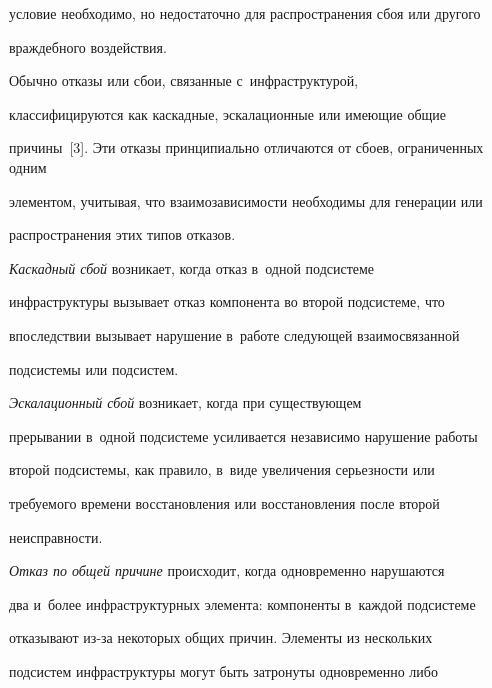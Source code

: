 условие необходимо, но недостаточно для распространения сбоя или другого  


враж\-деб\-но\-го воз\-дей\-ст\-вия.


{





}





  


  Обычно отказы или сбои, связанные с~инфраструктурой, 


классифицируются как кас\-кад\-ные, эскалационные или име\-ющие общие 


причины~[3]. Эти отказы принципиально отличаются от сбоев, ограниченных одним 


элементом, учитывая, что взаимозависимости необходимы для генерации или 


рас\-про\-стра\-не\-ния этих типов отказов.


  


  \textit{Каскадный сбой} возникает, когда отказ в~одной под\-сис\-те\-ме 


инфраструктуры вызывает отказ компонента во второй под\-сис\-те\-ме, что 


впоследствии вызывает нарушение в~работе сле\-ду\-ющей взаимосвязанной  


под\-сис\-те\-мы или под\-сис\-тем.


  


  \textit{Эскалационный сбой} возникает, когда при су\-щест\-ву\-ющем 


прерывании в~одной под\-сис\-те\-ме усиливается независимо нарушение работы 


второй под\-сис\-те\-мы, как правило, в~виде увеличения серь\-ез\-ности или  


тре\-бу\-емо\-го времени восстановления или восстановления после второй  


не\-ис\-прав\-ности.


  


  \textit{Отказ по общей причине} происходит, когда одновременно нарушаются 


два и~более инфраструктурных элемента: компоненты в~каждой под\-сис\-те\-ме 


отказывают из-за некоторых общих причин. Элементы из нескольких  


под\-сис\-тем инфраструктуры могут быть за\-тро\-ну\-ты одновременно либо 


